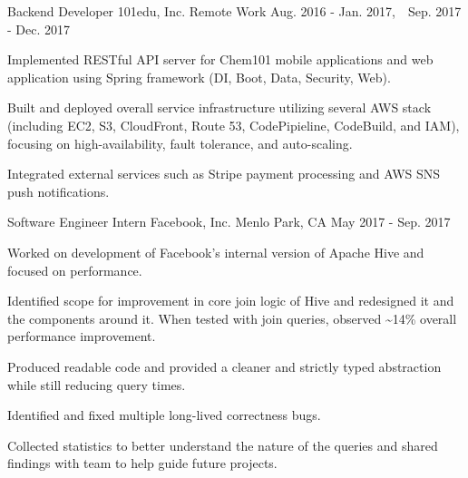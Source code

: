

\begin{cventries}

\cventry
{Backend Developer} %
{101edu, Inc.} %
{Remote Work} %
{Aug. 2016 - Jan. 2017,\ \ Sep. 2017 - Dec. 2017} %
{
	\begin{cvitems} %
		\item Implemented RESTful API server for Chem101 mobile applications and web application using Spring framework (DI, Boot, Data, Security, Web).
		\item Built and deployed overall service infrastructure utilizing several AWS stack (including EC2, S3, CloudFront, Route 53, CodePipieline, CodeBuild, and IAM), focusing on high-availability, fault tolerance, and auto-scaling.
		\item Integrated external services such as Stripe payment processing and AWS SNS push notifications.
	\end{cvitems}
}

  \cventry
    {Software Engineer Intern} %
    {Facebook, Inc.} %
    {Menlo Park, CA} %
    {May 2017 - Sep. 2017} %
    {
      \begin{cvitems} %
      	\item Worked on development of Facebook’s internal version of Apache Hive and focused on performance.
      	\item Identified scope for improvement in core join logic of Hive and redesigned it and the components around it. When tested with join queries, observed \textasciitilde 14\% overall performance improvement.
      	\item Produced readable code and provided a cleaner and strictly typed abstraction while still reducing query times.
      	\item Identified and fixed multiple long-lived correctness bugs.
      	\item Collected statistics to better understand the nature of the queries and shared findings with team to help guide future projects.
      \end{cvitems}
    }


\end{cventries}
